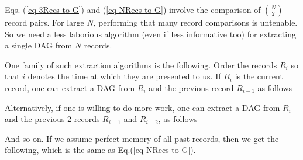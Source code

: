 \documentclass[12pt]{article}
\begin{document}
Eqs. (\ref{eq-3Recs-to-G})
and (\ref{eq-NRecs-to-G})
involve the comparison of $N\choose 2$
record pairs. For large $N$,
performing that many record comparisons
is untenable.
So we need a less laborious
algorithm (even if less informative too) for extracting
a single DAG from $N$  records.

One family of such extraction algorithms
is the following. Order the records $R_i$
so that $i$ denotes the time at
which  they 
are presented to us. If $R_i$ is the
current record,
one can extract a DAG from $R_i$ 
and the previous record $R_{i-1}$ as 
follows

\beq
{}
\eeq
Alternatively, if one
is willing to do more work,
one can extract a DAG from 
$R_i$ and the previous 2 records 
$R_{i-1}$ and $R_{i-2}$, as follows

\beq
{}
\eeq
And so on. If  we assume
perfect memory of all
past records, then we get the following,
which is the same as 
Eq.(\ref{eq-NRecs-to-G}).

\beq
{}
\eeq



\end{document}
